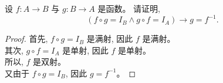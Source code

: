 \begin{problem}[反函数]
  设 $f: A \to B$ 与 $g: B \to A$ 是函数。
  请证明,
  \[
    (f \circ g = I_B \land g \circ f = I_A) \to g = f^{-1}.
  \]
\end{problem}

\begin{proof}
	首先, $f \circ g = I_{B}$ 是满射, 因此 $f$ 是满射。\\
  其次, $g \circ f = I_{A}$ 是单射, 因此 $f$ 是单射。\\
  所以, $f$ 是双射。\\
  又由于 $f \circ g = I_{B}$, 因此 $g = f^{-1}$。
\end{proof}